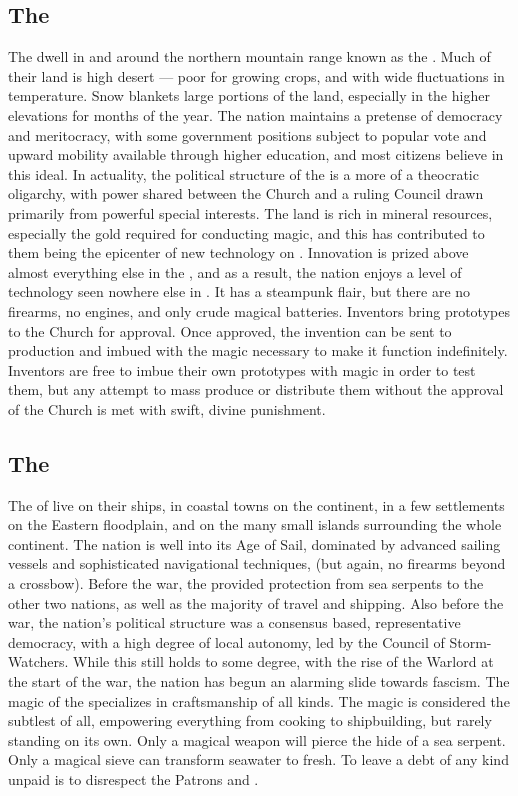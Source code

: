 \documentclass[blue]{GL2020}
\begin{document}
\subsection*{The \pTech{}}
The \pTech{} dwell in and around the northern mountain range known as the \pSpine{}. Much of their land is high desert — poor for growing crops, and with wide fluctuations in temperature. Snow blankets large portions of the land, especially in the higher elevations for months of the year. The nation maintains a pretense of democracy and meritocracy, with some government positions subject to popular vote and upward mobility available through higher education, and most citizens believe in this ideal. In actuality, the political structure of the \pTech{} is a more of a theocratic oligarchy, with power shared between the Church and a ruling Council drawn primarily from powerful special interests. The \pTech{} land is rich in mineral resources, especially the gold required for conducting magic, and this has contributed to them being the epicenter of new technology on \pEarth{}. Innovation is prized above almost everything else in the \pTech{}, and as a result, the nation enjoys a level of technology seen nowhere else in \pEarth{}. It has a steampunk flair, but there are no firearms, no engines, and only crude magical batteries. Inventors bring prototypes to the Church for approval. Once approved, the invention can be sent to production and imbued with the magic necessary to make it function indefinitely. Inventors are free to imbue their own prototypes with magic in order to test them, but any attempt to mass produce or distribute them without the approval of the Church is met with swift, divine punishment.

\subsection*{The \pShip{}}
The \pShippies{} of \pShip{} live on their ships, in coastal towns on the continent, in a few settlements on the Eastern floodplain, and on the many small islands surrounding the whole continent. The nation is well into its Age of Sail, dominated by advanced sailing vessels and sophisticated navigational techniques, (but again, no firearms beyond a crossbow). Before the war, the \pShippies{} provided protection from sea serpents to the other two nations, as well as the majority of travel and shipping. Also before the war, the nation's political structure was a consensus based, representative democracy, with a high degree of local autonomy, led by the Council of Storm-Watchers. While this still holds to some degree, with the rise of the Warlord \cLoud{\full} at the start of the war, the nation has begun an alarming slide towards fascism. The magic of the \pShippies{} specializes in craftsmanship of all kinds. The \pShip{} magic is considered the subtlest of all, empowering everything from cooking to shipbuilding, but rarely standing on its own. Only a magical weapon will pierce the hide of a sea serpent. Only a magical sieve can transform seawater to fresh. To leave a debt of any kind unpaid is to disrespect the Patrons \cEbbFull{} and \cFlowFull{}.
\end{document}
